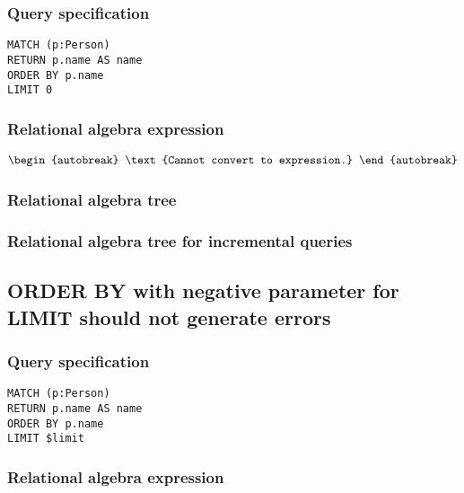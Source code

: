\subsubsection*{Query specification}

\begin{lstlisting}
MATCH (p:Person)
RETURN p.name AS name
ORDER BY p.name
LIMIT 0
\end{lstlisting}

\subsubsection*{Relational algebra expression}

\begin{align*}
\begin{autobreak}
\text{Cannot convert to expression.}
\end{autobreak}
\end{align*}

\subsubsection*{Relational algebra tree}


\subsubsection*{Relational algebra tree for incremental queries}


\subsection{ORDER BY with negative parameter for LIMIT should not generate errors}

\subsubsection*{Query specification}

\begin{lstlisting}
MATCH (p:Person)
RETURN p.name AS name
ORDER BY p.name
LIMIT $limit
\end{lstlisting}

\subsubsection*{Relational algebra expression}

